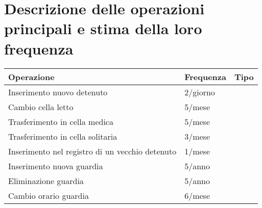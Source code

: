 \documentclass[a4paper,12pt]{report}
\begin{document}
\section{Descrizione delle operazioni principali e stima della loro frequenza}
\begin{table}[]
\begin{tabular}{lll}
\hline
Operazione & Frequenza & Tipo \\ \hline
Inserimento nuovo detenuto & 2/giorno &  \\
Cambio cella letto & 5/mese &  \\
Trasferimento in cella medica & 5/mese & \\
Trasferimento in cella solitaria & 3/mese & \\
Inserimento nel registro di un vecchio detenuto & 1/mese & \\
Inserimento nuova guardia & 5/anno & \\
Eliminazione guardia & 5/anno & \\
Cambio orario guardia & 6/mese & \\

\end{tabular}
\end{table}
\end{document}

